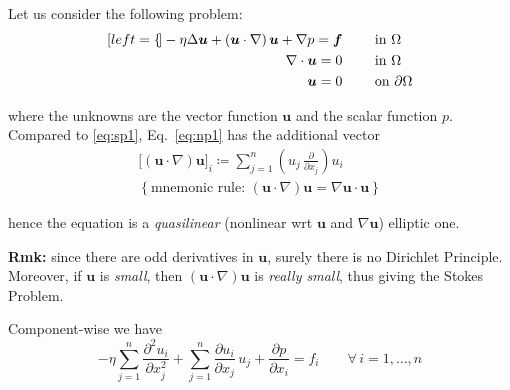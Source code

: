 



Let us consider the following problem:
\begin{subequations}
    \label{Navier-problem}
    \begin{align}[left=\empheqlbrace]
    -\eta\Delta \bm u+ \left( \bm u\cdot\nabla \right) \bm u +\nabla p = \bm f &\qquad\text{ in }\Omega  \label{eq:np1} \\
    \nabla\cdot \bm u=0 &\qquad\text{ in }\Omega \label{eq:np2} \\
    \bm u=0 &\qquad\text{ on }\partial\Omega \label{eq:np3}
    \end{align}
\end{subequations}

where the unknowns are the vector function $\bm u$ and the scalar function $p$. Compared to \eqref{eq:sp1}, Eq.~\eqref{eq:np1} has the additional vector
\begin{equation}
\label{eq:trilinear}
\begin{gathered}
\big[\left( \bm u\cdot\nabla \right) \bm u\big]_i \coloneq \sum_{j=1}^n \left( u_j\,\frac{\partial}{\partial x_j} \right) u_i \\
\left\{ \text{mnemonic rule: } \left( \bm u\cdot\nabla \right) \bm u = \nabla\bm u\cdot \bm u \right\}  
\end{gathered}
\end{equation}

hence the equation is a \emph{quasilinear} (nonlinear wrt $\bm u$ and $\nabla\bm u$) elliptic one.

\smallskip

\textbf{Rmk:} since there are odd derivatives in $\bm u$, surely there is no Dirichlet Principle. Moreover, if $\bm u$ is \emph{small}, then $\left( \bm u\cdot\nabla \right) \bm u$ is \emph{really small}, thus giving the Stokes Problem.

\smallskip

Component-wise we have
\begin{equation*}
-\eta \sum_{j=1}^n \frac{\partial^2 u_i}{\partial x^2_j} + \sum^{n}_{j=1} \frac{\partial u_i}{\partial x_j}\,u_j + \frac{\partial p}{\partial x_i} = f_i\qquad \forall\,i=1,\dots,n 
\end{equation*}

